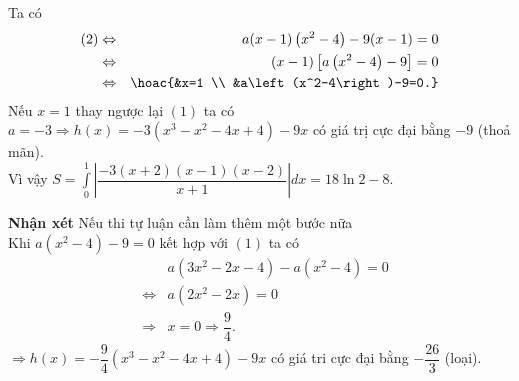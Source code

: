 \begin{ex}
{		Ta có 
		\begin{eqnarray*}
			(2) &\Leftrightarrow& a(x-1)\left(x^2-4\right)-9(x-1)=0\\ &\Leftrightarrow&(x-1)\left[a\left(x^2-4\right)-9\right]=0  \\
			&\Leftrightarrow&\hoac{&x=1 \\ &a\left(x^2-4\right)-9=0.}
		\end{eqnarray*}	
		Nếu $x=1$ thay ngược lại $ (1) $ ta có $a=-3 \Rightarrow h(x)=-3\left(x^3-x^2-4 x+4\right)-9 x$ có giá trị cực đại bằng $-9 $ (thoả mãn).\\
		Vì vậy $S=\displaystyle\int\limits_0^1\left|\dfrac{-3(x+2)(x-1)(x-2)}{x+1}\right| d x=18 \ln 2-8$.  		
		
		\noindent \textbf{Nhận xét}   Nếu thi tự luận   cần làm thêm một bước nữa \\
		Khi $a\left(x^2-4\right)-9=0$ kết hợp với $ (1) $ ta có 
		\begin{eqnarray*}
			&&a\left(3 x^2-2 x-4\right)-a\left(x^2-4\right)=0 \\
			&\Leftrightarrow& a\left(2 x^2-2 x\right)=0 \\
			&\Rightarrow& x=0 \Rightarrow\dfrac{9}{4}. 	
		\end{eqnarray*}
		$  \Rightarrow  h(x)=-\dfrac{9}{4}\left(x^3-x^2-4 x+4\right)-9 x $  có giá tri cực đại bằng $-\dfrac{26}{3}$ (loại). 	
	}
\end{ex}

